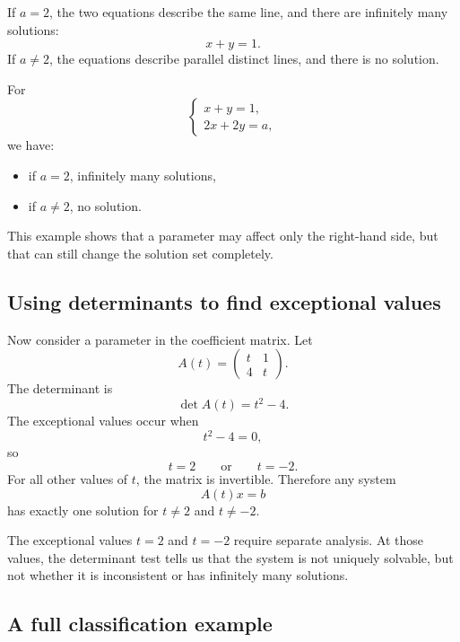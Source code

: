 If \(a=2\), the two equations describe the same line, and there are infinitely many solutions:
\[
x+y=1.
\]
If \(a\ne2\), the equations describe parallel distinct lines, and there is no solution.

\begin{summarybox}
For
\[
\begin{cases}
x+y=1,\\
2x+2y=a,
\end{cases}
\]
we have:
\begin{itemize}
\item if \(a=2\), infinitely many solutions,
\item if \(a\ne2\), no solution.
\end{itemize}
\end{summarybox}

This example shows that a parameter may affect only the right-hand side, but that can still change the solution set completely.

\subsection*{Using determinants to find exceptional values}

Now consider a parameter in the coefficient matrix. Let
\[
A(t)=\begin{pmatrix}
t&1\\
4&t
\end{pmatrix}.
\]
The determinant is
\[
\det A(t)=t^2-4.
\]
The exceptional values occur when
\[
t^2-4=0,
\]
so
\[
t=2
\qquad\text{or}\qquad
 t=-2.
\]
For all other values of \(t\), the matrix is invertible. Therefore any system
\[
A(t)x=b
\]
has exactly one solution for \(t\ne2\) and \(t\ne-2\).

The exceptional values \(t=2\) and \(t=-2\) require separate analysis. At those values, the determinant test tells us that the system is not uniquely solvable, but not whether it is inconsistent or has infinitely many solutions.

\subsection*{A full classification example}

